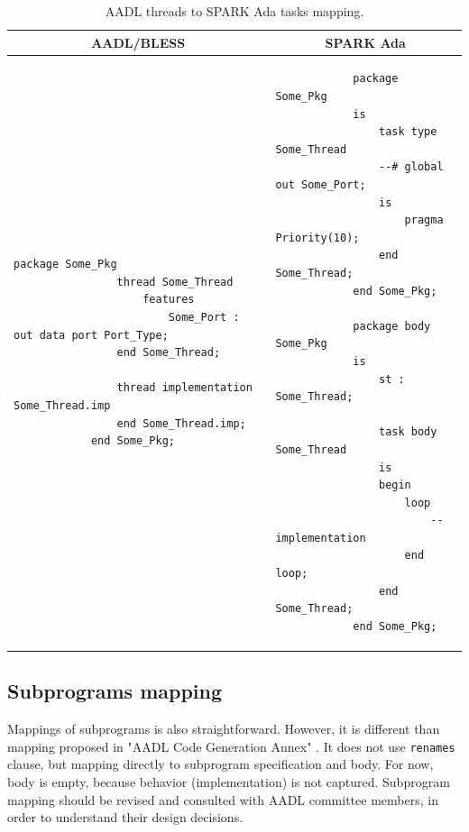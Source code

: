 \singlespacing
\begin{table}[!ht]
	\caption{AADL threads to SPARK Ada tasks mapping.}
	\label{table:threads2tasks}
	\centering
  	\begin{tabular}{ | p{3.5in} | p{2.5in} |}

		\hline
		\multicolumn{1}{|c|}{\textbf{AADL/BLESS}} & \multicolumn{1}{|c|}{\textbf{SPARK Ada}} \\ \hline

		\begin{lstlisting}[language=aadl]
			package Some_Pkg
				thread Some_Thread
					features
						Some_Port : out data port Port_Type;
				end Some_Thread;

				thread implementation Some_Thread.imp
				end Some_Thread.imp;
			end Some_Pkg;
		\end{lstlisting} 
		& 
		\begin{lstlisting}
			package Some_Pkg
			is
				task type Some_Thread
				--# global out Some_Port;
				is
					pragma Priority(10);
				end Some_Thread;
			end Some_Pkg;

			package body Some_Pkg
			is
				st : Some_Thread;

				task body Some_Thread
				is
				begin
					loop
						-- implementation
					end loop;
				end Some_Thread;
			end Some_Pkg;
		\end{lstlisting} 

		\\ \hline
	\end{tabular}
\end{table}
\doublespacing


\subsection{Subprograms mapping}
\label{codegen:mapping:subprograms}

Mappings of subprograms is also straightforward. However, it is different than mapping proposed in "AADL Code Generation Annex" \cite{AnnexDoc}. It does not use \lstinline{renames} clause, but mapping directly to subprogram specification and body. For now, body is empty, because behavior (implementation) is not captured. Subprogram mapping should be revised and consulted with AADL committee members, in order to understand their design decisions.

